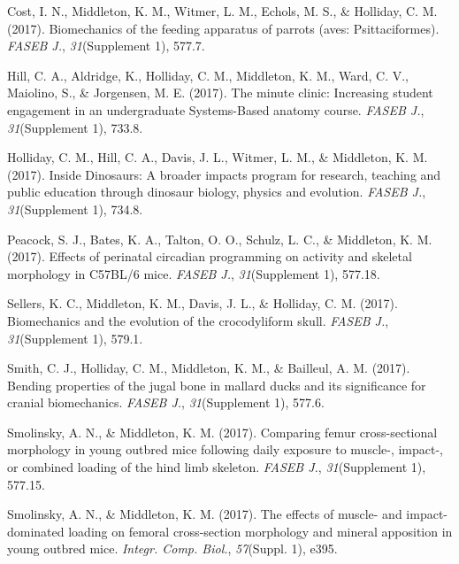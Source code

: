 \documentclass[11pt, a4paper]{awesome-cv}
\begin{document}
\leavevmode\hypertarget{ref-cost_biomechanics_2017}{}%
Cost, I. N., Middleton, K. M., Witmer, L. M., Echols, M. S., \&
Holliday, C. M. (2017). Biomechanics of the feeding apparatus of parrots
(aves: Psittaciformes). \emph{FASEB J.}, \emph{31}(Supplement 1), 577.7.

\leavevmode\hypertarget{ref-hill_aaa_2017}{}%
Hill, C. A., Aldridge, K., Holliday, C. M., Middleton, K. M., Ward, C.
V., Maiolino, S., \& Jorgensen, M. E. (2017). The minute clinic:
Increasing student engagement in an undergraduate Systems-Based anatomy
course. \emph{FASEB J.}, \emph{31}(Supplement 1), 733.8.

\leavevmode\hypertarget{ref-holliday_dinosaurs_2017}{}%
Holliday, C. M., Hill, C. A., Davis, J. L., Witmer, L. M., \& Middleton,
K. M. (2017). Inside Dinosaurs: A broader impacts program for research,
teaching and public education through dinosaur biology, physics and
evolution. \emph{FASEB J.}, \emph{31}(Supplement 1), 734.8.

\leavevmode\hypertarget{ref-peacock_effects_2017}{}%
Peacock, S. J., Bates, K. A., Talton, O. O., Schulz, L. C., \&
Middleton, K. M. (2017). Effects of perinatal circadian programming on
activity and skeletal morphology in C57BL/6 mice. \emph{FASEB J.},
\emph{31}(Supplement 1), 577.18.

\leavevmode\hypertarget{ref-Sellers2017-uj}{}%
Sellers, K. C., Middleton, K. M., Davis, J. L., \& Holliday, C. M.
(2017). Biomechanics and the evolution of the crocodyliform skull.
\emph{FASEB J.}, \emph{31}(Supplement 1), 579.1.

\leavevmode\hypertarget{ref-Smith2017-ws}{}%
Smith, C. J., Holliday, C. M., Middleton, K. M., \& Bailleul, A. M.
(2017). Bending properties of the jugal bone in mallard ducks and its
significance for cranial biomechanics. \emph{FASEB J.},
\emph{31}(Supplement 1), 577.6.

\leavevmode\hypertarget{ref-smolinsky_comparing_2017}{}%
Smolinsky, A. N., \& Middleton, K. M. (2017). Comparing femur
cross-sectional morphology in young outbred mice following daily
exposure to muscle-, impact-, or combined loading of the hind limb
skeleton. \emph{FASEB J.}, \emph{31}(Supplement 1), 577.15.

\leavevmode\hypertarget{ref-Smolinsky2017-gk}{}%
Smolinsky, A. N., \& Middleton, K. M. (2017). The effects of muscle- and
impact-dominated loading on femoral cross-section morphology and mineral
apposition in young outbred mice. \emph{Integr. Comp. Biol.},
\emph{57}(Suppl. 1), e395.
\end{document}
